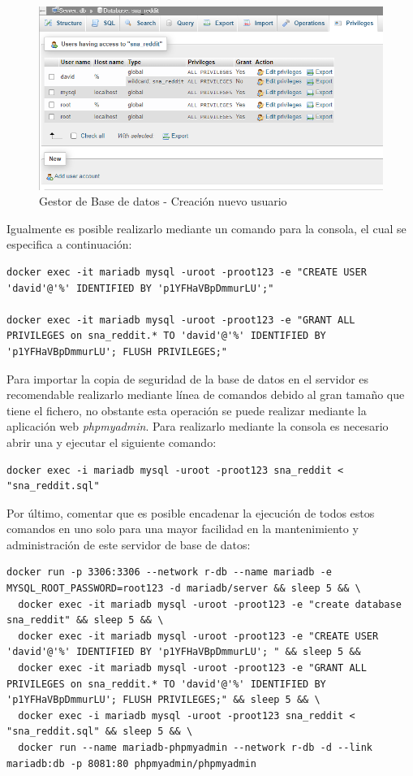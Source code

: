 \documentclass[../../main.tex]{subfiles}
\begin{document}
\begin{figure}[H]
\centering
\includegraphics[width=\textwidth]{images/apendices/phpmyadmin-2.png}
\caption{Gestor de Base de datos - Creación nuevo usuario}
\end{figure}

Igualmente es posible realizarlo mediante un comando para la consola, el cual se especifica a continuación:

\begin{lstlisting}
docker exec -it mariadb mysql -uroot -proot123 -e "CREATE USER 'david'@'%' IDENTIFIED BY 'p1YFHaVBpDmmurLU';"

docker exec -it mariadb mysql -uroot -proot123 -e "GRANT ALL PRIVILEGES on sna_reddit.* TO 'david'@'%' IDENTIFIED BY 'p1YFHaVBpDmmurLU'; FLUSH PRIVILEGES;"
\end{lstlisting}

\vskip 0.2in

Para importar la copia de seguridad de la base de datos en el servidor es recomendable realizarlo mediante línea de comandos debido al gran tamaño que tiene el fichero, no obstante esta operación se puede realizar mediante la aplicación web \textit{\gls{phpmyadmin}}. Para realizarlo mediante la consola es necesario abrir una y ejecutar el siguiente comando:

\begin{lstlisting}
docker exec -i mariadb mysql -uroot -proot123 sna_reddit < "sna_reddit.sql"
\end{lstlisting}

Por último, comentar que es posible encadenar la ejecución de todos estos comandos en uno solo para una mayor facilidad en la mantenimiento y administración de este servidor de base de datos:

\begin{lstlisting}
docker run -p 3306:3306 --network r-db --name mariadb -e MYSQL_ROOT_PASSWORD=root123 -d mariadb/server && sleep 5 && \
  docker exec -it mariadb mysql -uroot -proot123 -e "create database sna_reddit" && sleep 5 && \
  docker exec -it mariadb mysql -uroot -proot123 -e "CREATE USER 'david'@'%' IDENTIFIED BY 'p1YFHaVBpDmmurLU'; " && sleep 5 &&
  docker exec -it mariadb mysql -uroot -proot123 -e "GRANT ALL PRIVILEGES on sna_reddit.* TO 'david'@'%' IDENTIFIED BY 'p1YFHaVBpDmmurLU'; FLUSH PRIVILEGES;" && sleep 5 && \
  docker exec -i mariadb mysql -uroot -proot123 sna_reddit < "sna_reddit.sql" && sleep 5 && \
  docker run --name mariadb-phpmyadmin --network r-db -d --link mariadb:db -p 8081:80 phpmyadmin/phpmyadmin
\end{lstlisting}
\end{document}
